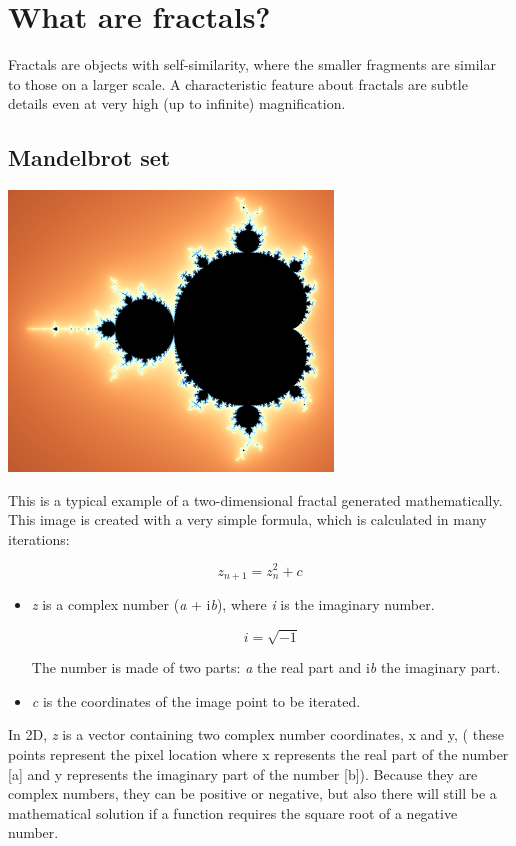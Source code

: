 \section{What are fractals?}\label{what-are-fractals}

Fractals are objects with self-similarity, where the smaller fragments are
similar to those on a larger scale. A characteristic feature about fractals are subtle
details even at very high (up to infinite) magnification.

\subsection{Mandelbrot set}\label{mandelbrot-set}

\includegraphics[width=0.5\linewidth]{img/manual/media/mandelbrot_set.png}

This is a typical example of a two-dimensional fractal generated mathematically.
This image is created with a very simple formula, which is calculated in many
iterations:

\[z_{n + 1} = z_{n}^{2} + c\]

\begin{itemize}
	
	
	\item\emph{z} is a complex number (\emph{a} + i\emph{b}), where \emph{i} is
	the imaginary number.
	
	\[ i = \sqrt{-1} \]
	
	The number is made of two parts: \emph{a} the real part and i\emph{b} the
	imaginary part.
	
	\item\emph{c} is the coordinates of the image point to be iterated.
\end{itemize}

In 2D, \emph{z} is a vector containing two complex number coordinates, x and y,
( these points represent the pixel location where x represents the real part of
the number {[}a{]} and y represents the imaginary part of the number {[}b{]}).
Because they are complex numbers, they can be positive or negative, but also
there will still be a mathematical solution if a function requires the square
root of a negative number.

